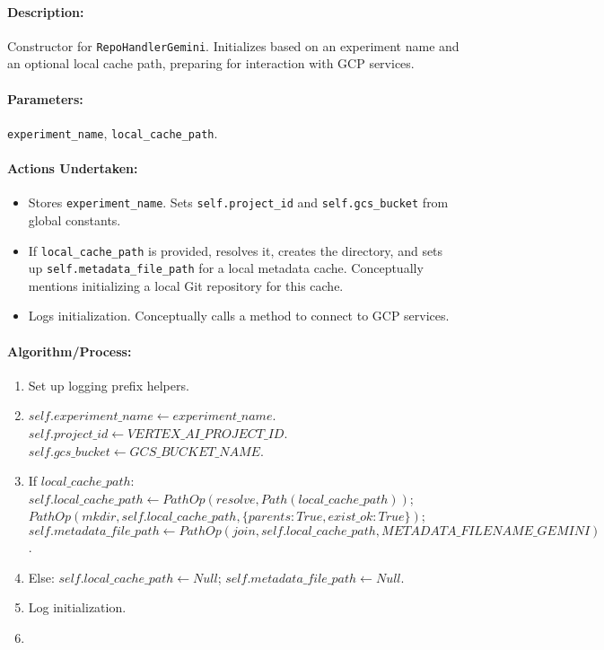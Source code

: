 \documentclass{article}
\begin{document}
\paragraph{Description:} Constructor for \texttt{RepoHandlerGemini}. Initializes based on an experiment name and an optional local cache path, preparing for interaction with GCP services.
\paragraph{Parameters:} \texttt{experiment\_name}, \texttt{local\_cache\_path}.
\paragraph{Actions Undertaken:}
\begin{itemize}
    \item Stores \texttt{experiment\_name}. Sets \texttt{self.project\_id} and \texttt{self.gcs\_bucket} from global constants.
    \item If \texttt{local\_cache\_path} is provided, resolves it, creates the directory, and sets up \texttt{self.metadata\_file\_path} for a local metadata cache. Conceptually mentions initializing a local Git repository for this cache.
    \item Logs initialization. Conceptually calls a method to connect to GCP services.
\end{itemize}
\paragraph{Algorithm/Process:}
\begin{enumerate}
    \item Set up logging prefix helpers.
    \item $self.experiment\_name \leftarrow experiment\_name$. $self.project\_id \leftarrow VERTEX\_AI\_PROJECT\_ID$. $self.gcs\_bucket \leftarrow GCS\_BUCKET\_NAME$.
    \item If $local\_cache\_path$:
        $self.local\_cache\_path \leftarrow PathOp(resolve, Path(local\_cache\_path))$;
        $PathOp(mkdir, self.local\_cache\_path, \{parents:True, exist\_ok:True\})$;
        $self.metadata\_file\_path \leftarrow PathOp(join, self.local\_cache\_path, METADATA\_FILENAME\_GEMINI)$.
    \item Else: $self.local\_cache\_path \leftarrow Null$; $self.metadata\_file\_path \leftarrow Null$.
    \item Log initialization.
    \item %
\end{enumerate}
\end{document}
